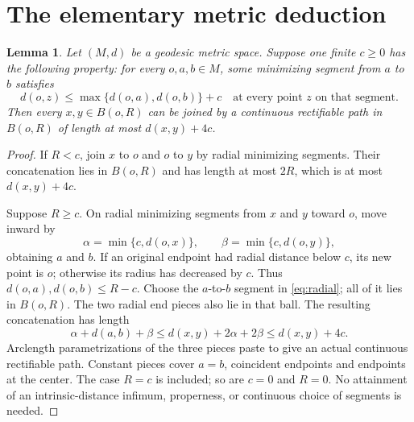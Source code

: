 \documentclass[10pt]{article}
\newtheorem{lemma}[theorem]{Lemma}
\begin{document}
\section{The elementary metric deduction}
\begin{lemma}\label{lem:retreat}
Let $(M,d)$ be a geodesic metric space. Suppose one finite $c\geq0$
has the following property: for every $o,a,b\in M$, some minimizing
segment from $a$ to $b$ satisfies
\begin{equation}\label{eq:radial}
 d(o,z)\leq\max\{d(o,a),d(o,b)\}+c
 \quad\text{at every point }z\text{ on that segment}.
\end{equation}
Then every $x,y\in B(o,R)$ can be joined by a continuous rectifiable
path in $B(o,R)$ of length at most $d(x,y)+4c$.
\end{lemma}
\begin{proof}
If $R<c$, join $x$ to $o$ and $o$ to $y$ by radial minimizing segments.
Their concatenation lies in $B(o,R)$ and has length at most $2R$, which
is at most $d(x,y)+4c$.

Suppose $R\geq c$. On radial minimizing segments from $x$ and $y$
toward $o$, move inward by
\[
 \alpha=\min\{c,d(o,x)\},\qquad
 \beta=\min\{c,d(o,y)\},
\]
obtaining $a$ and $b$. If an original endpoint had radial distance below
$c$, its new point is $o$; otherwise its radius has decreased by $c$.
Thus $d(o,a),d(o,b)\leq R-c$. Choose the $a$-to-$b$ segment in
\eqref{eq:radial}; all of it lies in $B(o,R)$. The two radial end pieces
also lie in that ball. The resulting concatenation has length
\[
 \alpha+d(a,b)+\beta
 \leq d(x,y)+2\alpha+2\beta
 \leq d(x,y)+4c.
\]
Arclength parametrizations of the three pieces paste to give an actual
continuous rectifiable path. Constant pieces cover $a=b$, coincident
endpoints and endpoints at the center. The case $R=c$ is included; so
are $c=0$ and $R=0$. No attainment of an intrinsic-distance infimum,
properness, or continuous choice of segments is needed.
\end{proof}
\end{document}
